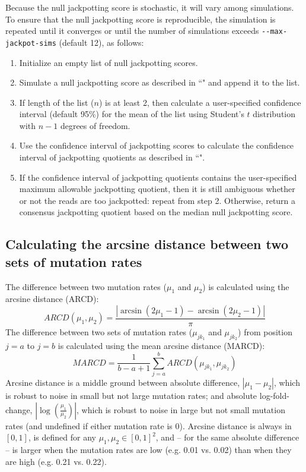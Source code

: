 \documentclass{article}
\begin{document}
Because the null jackpotting score is stochastic, it will vary among simulations.
To ensure that the null jackpotting score is reproducible, the simulation is repeated until it converges or until the number of simulations exceeds \verb|--max-jackpot-sims| (default 12), as follows:
\begin{enumerate}
    \item Initialize an empty list of null jackpotting scores.
    \item Simulate a null jackpotting score as described in ``" and append it to the list.
    \item If length of the list ($n$) is at least 2, then calculate a user-specified confidence interval (default 95\%) for the mean of the list using Student's $t$ distribution with $n - 1$ degrees of freedom.
    \item Use the confidence interval of jackpotting scores to calculate the confidence interval of jackpotting quotients as described in ``".
    \item If the confidence interval of jackpotting quotients contains the user-specified maximum allowable jackpotting quotient, then it is still ambiguous whether or not the reads are too jackpotted: repeat from step 2. Otherwise, return a consensus jackpotting quotient based on the median null jackpotting score.
\end{enumerate}


\subsection{Calculating the arcsine distance between two sets of mutation rates}
\label{calc-arcsine-distance}

The difference between two mutation rates ($\mu_1$ and $\mu_2$) is calculated using the arcsine distance (ARCD):
\begin{equation}
    ARCD(\mu_1, \mu_2) = \frac{|\arcsin{(2\mu_1 - 1)} - \arcsin{(2\mu_2 - 1)}|}{\pi}
\end{equation}
The difference between two sets of mutation rates ($\mu_{jk_1}$ and $\mu_{jk_2}$) from position $j = a$ to $j = b$ is calculated using the mean arcsine distance (MARCD):
\begin{equation}
    MARCD = \frac{1}{b - a + 1}\sum_{j=a}^b{ARCD(\mu_{jk_1}, \mu_{jk_2})}
\end{equation}
Arcsine distance is a middle ground between absolute difference, $|\mu_1 - \mu_2|$, which is robust to noise in small but not large mutation rates; and absolute log-fold-change, $|\log{(\frac{\mu_1}{\mu_2})}|$, which is robust to noise in large but not small mutation rates (and undefined if either mutation rate is 0). Arcsine distance is always in $[0, 1]$, is defined for any $\mu_1, \mu_2 \in [0, 1]^2$, and -- for the same absolute difference -- is larger when the mutation rates are low (e.g. 0.01 vs. 0.02) than when they are high (e.g. 0.21 vs. 0.22).
\end{document}
